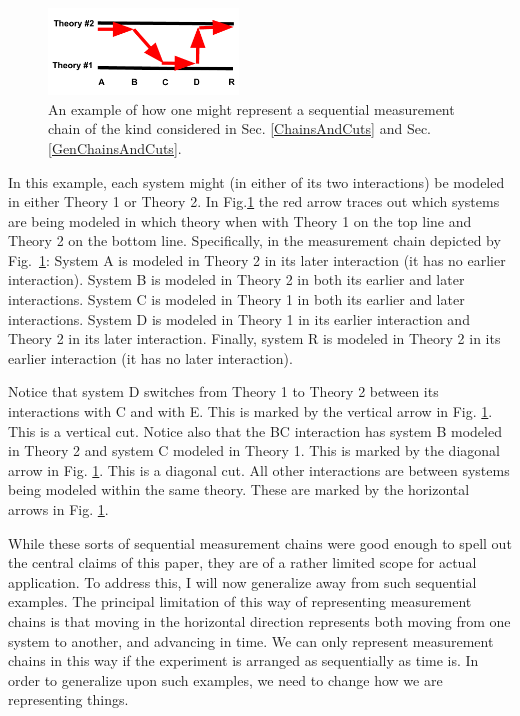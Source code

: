 \documentclass[prd,twocolumn,superscriptaddress,floatfix,amsmath,amssymb,amsfonts,nofootinbib]{revtex4-2}
\begin{document}
\begin{figure}
\includegraphics[width=0.45\textwidth]{Figures/ExampleChain.pdf}
\caption{An example of how one might represent a sequential measurement chain of the kind considered in Sec. \ref{ChainsAndCuts} and Sec. \ref{GenChainsAndCuts}. }\label{FigExChain}
\end{figure}

In this example, each system might (in either of its two interactions) be modeled in either Theory 1 or Theory 2. In Fig.\ref{FigExChain} the red arrow traces out which systems are being modeled in which theory when with Theory 1 on the top line and Theory 2 on the bottom line. Specifically, in the measurement chain depicted by Fig.~\ref{FigExChain}: System A is modeled in Theory 2 in its later interaction (it has no earlier interaction). System B is modeled in Theory 2 in both its earlier and later interactions. System C is modeled in Theory 1 in both its earlier and later interactions. System D is modeled in Theory 1 in its earlier interaction and Theory 2 in its later interaction. Finally, system R is modeled in Theory 2 in its earlier interaction (it has no later interaction).

Notice that system D switches from Theory 1 to Theory 2 between its interactions with C and with E. This is marked by the vertical arrow in Fig. \ref{FigExChain}. This is a vertical cut. Notice also that the BC interaction has system  B modeled in Theory 2 and system C modeled in Theory 1. This is marked by the diagonal arrow in Fig. \ref{FigExChain}. This is a diagonal cut. All other interactions are between systems being modeled within the same theory. These are marked by the horizontal arrows in Fig. \ref{FigExChain}.

While these sorts of sequential measurement chains were good enough to spell out the central claims of this paper, they are of a rather limited scope for actual application. To address this, I will now generalize away from such sequential examples. The principal limitation of this way of representing measurement chains is that moving in the horizontal direction represents both moving from one system to another, and advancing in time. We can only represent measurement chains in this way if the experiment is arranged as sequentially as time is. In order to generalize upon such examples, we need to change how we are representing things.
\end{document}
